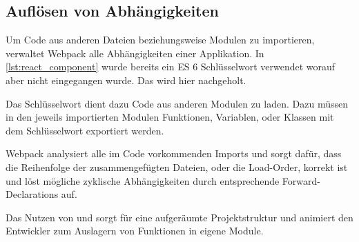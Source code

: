 \subsection{Auflösen von Abhängigkeiten}
\label{sec:gw_aufloesen_von_abhaengigkeiten}

Um Code aus anderen Dateien beziehungsweise Modulen zu importieren, verwaltet
Webpack alle Abhängigkeiten einer Applikation.  In \cref{lst:react_component}
wurde bereits ein ES 6 Schlüsselwort verwendet worauf aber nicht eingegangen
wurde.  Das wird hier nachgeholt.

Das Schlüsselwort  dient dazu Code aus anderen Modulen zu laden.
Dazu müssen in den jeweils importierten Modulen Funktionen, Variablen, oder
Klassen mit dem Schlüsselwort  exportiert werden. 

Webpack analysiert alle im Code vorkommenden Imports und sorgt dafür, dass die
Reihenfolge der zusammengefügten Dateien, oder die Load-Order, korrekt ist und
löst mögliche zyklische Abhängigkeiten durch entsprechende Forward-Declarations
auf.

Das Nutzen von  und  sorgt für eine aufgeräumte
Projektstruktur und animiert den Entwickler zum Auslagern von Funktionen in
eigene Module.
